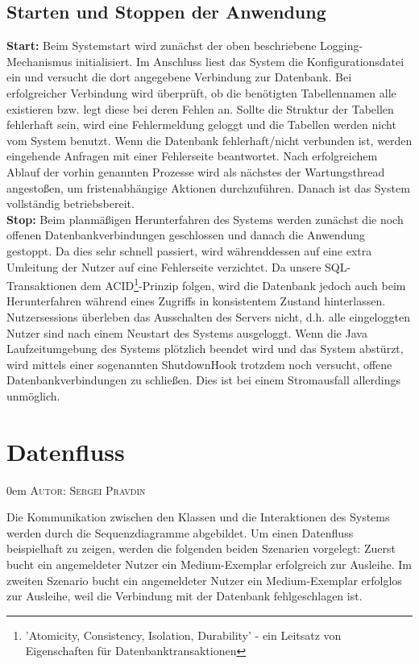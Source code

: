 \documentclass{article}
\makeatletter
\newcommand{\sectionauthor}[1]{
	{\parindent 0em \large \scshape Autor: #1 \par \nobreak \vspace*{1em}}
	\@afterheading
}
\makeatother
\begin{document}
\subsection{Starten und Stoppen der Anwendung}
\noindent \textbf{Start:} Beim Systemstart wird zunächst der oben beschriebene Logging-Mechanismus initialisiert. Im Anschluss liest das System die Konfigurationsdatei ein und versucht die dort angegebene Verbindung zur Datenbank. Bei erfolgreicher Verbindung wird überprüft, ob die benötigten Tabellennamen alle existieren bzw. legt diese bei deren Fehlen an. Sollte die Struktur der Tabellen fehlerhaft sein, wird eine Fehlermeldung geloggt und die Tabellen werden nicht vom System benutzt. Wenn die Datenbank fehlerhaft/nicht verbunden ist, werden eingehende Anfragen mit einer Fehlerseite beantwortet. Nach erfolgreichem Ablauf der vorhin genannten Prozesse wird als nächstes der Wartungsthread angestoßen, um fristenabhängige Aktionen durchzuführen. Danach ist das System vollständig betriebsbereit.\\
\textbf{Stop:}
Beim planmäßigen Herunterfahren des Systems werden zunächst die noch offenen Datenbankverbindungen geschlossen und danach die Anwendung gestoppt. Da dies sehr schnell passiert, wird währenddessen auf eine extra Umleitung der Nutzer auf eine Fehlerseite verzichtet. Da unsere SQL-Transaktionen dem ACID\footnote{'Atomicity, Consistency, Isolation, Durability' - ein Leitsatz von Eigenschaften für Datenbanktransaktionen}-Prinzip folgen, wird die Datenbank jedoch auch beim Herunterfahren während eines Zugriffs in konsistentem Zustand hinterlassen. Nutzersessions überleben das Ausschalten des Servers nicht, d.h. alle eingeloggten Nutzer sind nach einem Neustart des Systems ausgeloggt. Wenn die Java Laufzeitumgebung des Systems plötzlich beendet wird und das System abstürzt, wird mittels einer sogenannten ShutdownHook trotzdem noch versucht, offene Datenbankverbindungen zu schließen. Dies ist bei einem Stromausfall allerdings unmöglich.
\newpage
\section{Datenfluss}
\sectionauthor{Sergei Pravdin}
Die Kommunikation zwischen den Klassen und die Interaktionen des Systems werden durch die Sequenzdiagramme abgebildet. Um einen Datenfluss beispielhaft zu zeigen, werden die folgenden beiden Szenarien vorgelegt: Zuerst bucht ein angemeldeter Nutzer ein Medium-Exemplar erfolgreich zur Ausleihe. Im zweiten Szenario bucht ein angemeldeter Nutzer ein Medium-Exemplar erfolglos zur Ausleihe, weil die Verbindung mit der Datenbank fehlgeschlagen ist.
\end{document}
